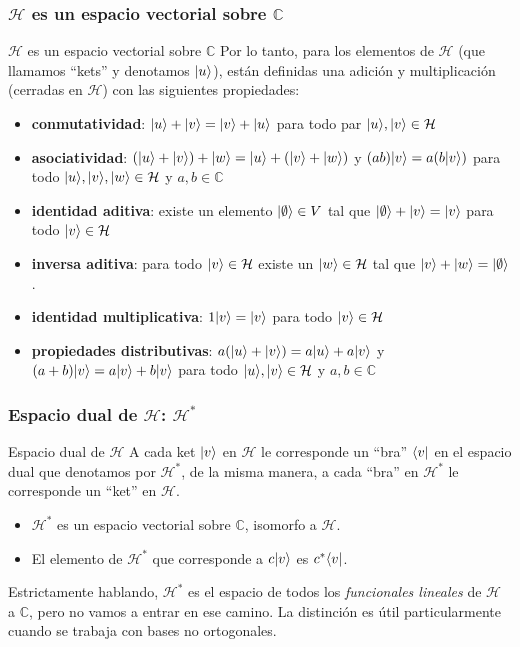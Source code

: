 \documentclass{beamer}
\begin{document}
    \begin{frame}
        \frametitle{$\mathcal{H}$ es un espacio vectorial sobre $\mathbb{C}$}
        \begin{block}{$\mathcal{H}$ es un espacio vectorial sobre $\mathbb{C}$}
            Por lo tanto, para los elementos de $\mathcal{H}$ (que llamamos ``kets'' y denotamos $| u \rangle$), están definidas una adición y multiplicación (cerradas en $\mathcal{H}$) con las siguientes propiedades:
            \begin{itemize}
                \item {\bf conmutatividad}: $| u \rangle+| v \rangle=| v \rangle+| u \rangle$ para todo par $| u \rangle,| v \rangle\in \mathcal{H}$
                \item {\bf asociatividad}: $(| u \rangle+| v \rangle)+| w \rangle=| u \rangle+(| v \rangle+| w \rangle)$ y $(ab)| v \rangle=a(b| v \rangle)$ para todo $| u \rangle,| v \rangle,| w \rangle\in\mathcal{H}$ y $a,b\in\mathbb{C}$
                \item {\bf identidad aditiva}: existe un elemento $| \emptyset \rangle\in V$ tal que  $| \emptyset \rangle+| v \rangle=| v \rangle$ para todo $| v \rangle\in\mathcal{H}$
                \item {\bf inversa aditiva}: para todo $| v \rangle\in\mathcal{H}$ existe un $| w \rangle\in\mathcal{H}$ tal que $| v \rangle+| w \rangle=| \emptyset \rangle$. 
                \item {\bf identidad multiplicativa}: $1| v \rangle=| v \rangle$ para todo $| v \rangle\in\mathcal{H}$
                \item {\bf propiedades distributivas}: $a(| u \rangle+| v \rangle)=a| u \rangle+a| v \rangle$ y $(a+b)| v \rangle=a| v \rangle+b| v \rangle$ para todo $| u \rangle,| v \rangle\in \mathcal{H}$ y $a,b\in \mathbb{C}$
            \end{itemize}
        \end{block}
        
    \end{frame}
    
    \begin{frame}
        \frametitle{Espacio dual de $\mathcal{H}$: $\mathcal{H}^*$}
        \begin{block}{Espacio dual de $\mathcal{H}$}
            A cada ket $| v \rangle$ en $\mathcal{H}$ le corresponde un ``bra'' $\langle v |$ en el espacio dual que denotamos por $\mathcal{H}^*$, de la misma manera, a cada ``bra'' en $\mathcal{H}^*$ le corresponde un ``ket'' en $\mathcal{H}$.
            \begin{itemize}
                \item $\mathcal{H}^*$ es un espacio vectorial sobre $\mathbb{C}$, isomorfo a $\mathcal{H}$.
                \item El elemento de $\mathcal{H}^*$ que corresponde a $c| v \rangle$ es $c^*\langle v |$.
            \end{itemize}
        \end{block}
        Estrictamente hablando, $\mathcal{H}^*$ es el espacio de todos los {\em funcionales lineales} de $\mathcal{H}$ a $\mathbb{C}$, pero no vamos a entrar en ese camino. La distinción es útil particularmente cuando se trabaja con bases no ortogonales.
    \end{frame}
    
\end{document}
